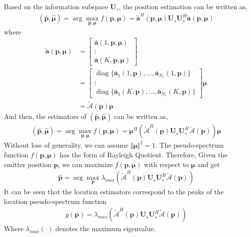 \documentclass[journal,10pt]{IEEEtran}
\def \diag{\operatorname{diag}}
\def \arg{\operatorname{arg}}
\begin{document}
Based on the information subspace $\boldsymbol{U}_s$, the position estimation can be written as,
\begin{align}\label{eq:18}
    (\hat{\boldsymbol{p}},\hat{\boldsymbol{\mu}})=\arg \max_{\boldsymbol{p},\boldsymbol{\mu}} f(\boldsymbol{p},\boldsymbol{\mu})=\tilde{\boldsymbol{a}}^H(\boldsymbol{p},\boldsymbol{\mu})\boldsymbol{U}_s\boldsymbol{U}_s^H\tilde{\boldsymbol{a}}(\boldsymbol{p},\boldsymbol{\mu})
\end{align}
where 
\begin{align}\label{eq:19}
    \tilde{\boldsymbol{a}}(\boldsymbol{p},\boldsymbol{\mu})&=\left[
        \begin{array}{c}
            \bar{\boldsymbol{a}}(1,\boldsymbol{p},\boldsymbol{\mu})\\
            \vdots\\
            \bar{\boldsymbol{a}}(K,\boldsymbol{p},\boldsymbol{\mu})
        \end{array}
    \right]\\
    &=\left[
    \begin{array}{c}
        \diag\{\bar{\boldsymbol{a}}_1(1,\boldsymbol{p}),\dots,\bar{\boldsymbol{a}}_{N_r}(1,\boldsymbol{p})\}\\
        \vdots\\
        \diag\{\bar{\boldsymbol{a}}_1(K,\boldsymbol{p}),\dots,\bar{\boldsymbol{a}}_{N_r}(K,\boldsymbol{p})\}
    \end{array}        
    \right]\boldsymbol{\mu}\\
    &=\tilde{\mathcal{A}}(\boldsymbol{p})\boldsymbol{\mu}
\end{align}
And then, the estimators of $(\hat{\boldsymbol{p}},\hat{\boldsymbol{\mu}})$ can be written as,
\begin{align}\label{eq:20}
    (\hat{\boldsymbol{p}},\hat{\boldsymbol{\mu}})=\arg \max_{\boldsymbol{p},\boldsymbol{\mu}} f(\boldsymbol{p},\boldsymbol{\mu})=\boldsymbol{\mu}^H(\tilde{\mathcal{A}}^H(\boldsymbol{p})\boldsymbol{U}_s\boldsymbol{U}_s^H\tilde{\mathcal{A}}(\boldsymbol{p}))\boldsymbol{\mu}
\end{align}
Without loss of generality, we can assume $\Vert \boldsymbol{\mu}\Vert ^2=1$. The pseudo-spectrum function $f(\boldsymbol{p},\boldsymbol{\mu})$ has the form of Rayleigh Quotient. 
Therefore, Given the emitter position $\boldsymbol{p}$, we can maximize $f(\boldsymbol{p},\boldsymbol{\mu})$ with respect to $\boldsymbol{\mu}$ and get
\begin{align}\label{eq:21}
    \hat{\boldsymbol{p}}=\arg \max_{\boldsymbol{p}} \lambda_{max}(\tilde{\mathcal{A}}^H(\boldsymbol{p})\boldsymbol{U}_s\boldsymbol{U}_s^H\tilde{\mathcal{A}}(\boldsymbol{p}))
\end{align}
It can be seen that the location estimators correspond to the peaks of the location pseudo-spectrum function
\begin{align}\label{eq:22}
    g(\boldsymbol{p})=\lambda_{max}(\tilde{\mathcal{A}}^H(\boldsymbol{p})\boldsymbol{U}_s\boldsymbol{U}_s^H\tilde{\mathcal{A}}(\boldsymbol{p}))
\end{align}
Where $\lambda_{max}(\cdot)$ denotes the maximum eigenvalue. 
\end{document}
